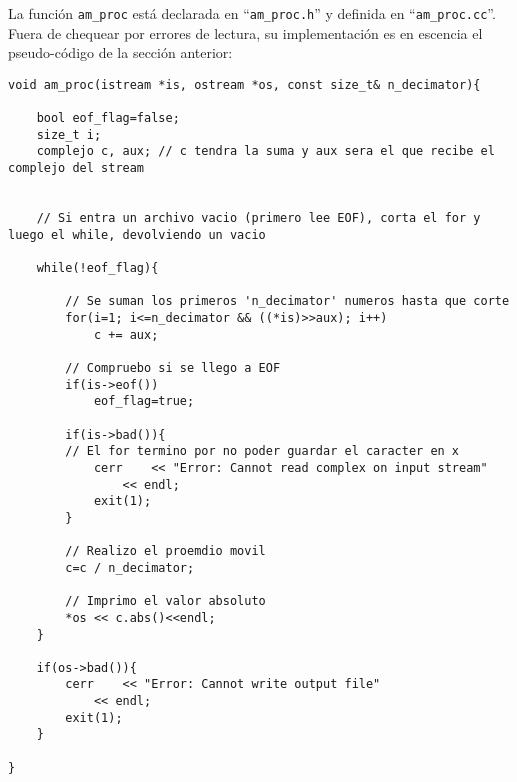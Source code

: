 La función \texttt{am\_proc} está declarada en ``\texttt{am\_proc.h}'' y definida en ``\texttt{am\_proc.cc}''. Fuera de chequear por errores de lectura, su implementación es en escencia el pseudo-código de la sección anterior:

\lstset{language=C++}
\begin{lstlisting}[frame=single]
void am_proc(istream *is, ostream *os, const size_t& n_decimator){
	
	bool eof_flag=false;
	size_t i;
	complejo c, aux; // c tendra la suma y aux sera el que recibe el complejo del stream	


	// Si entra un archivo vacio (primero lee EOF), corta el for y luego el while, devolviendo un vacio

	while(!eof_flag){
		
		// Se suman los primeros 'n_decimator' numeros hasta que corte 
		for(i=1; i<=n_decimator && ((*is)>>aux); i++)
			c += aux;
	
		// Compruebo si se llego a EOF
		if(is->eof())
			eof_flag=true;

		if(is->bad()){ 
		// El for termino por no poder guardar el caracter en x
			cerr	<< "Error: Cannot read complex on input stream"
				<< endl;
			exit(1);
		}		

		// Realizo el proemdio movil
		c=c / n_decimator;
			
		// Imprimo el valor absoluto
		*os << c.abs()<<endl;
	}
	
	if(os->bad()){
		cerr	<< "Error: Cannot write output file"
			<< endl;
		exit(1);
	}

}
\end{lstlisting}

